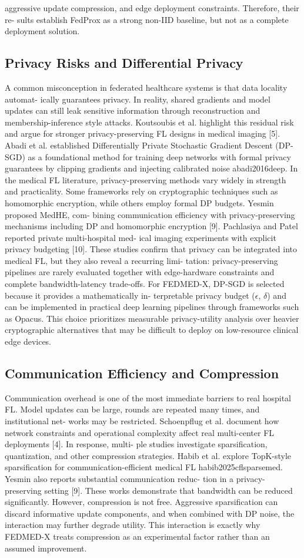 \documentclass[12pt,a4paper]{report}
\begin{document}
aggressive update compression, and edge deployment constraints. Therefore, their re- sults establish FedProx as a strong non-IID baseline, but not as a complete deployment solution.
\subsection{Privacy Risks and Differential Privacy}
A common misconception in federated healthcare systems is that data locality automat- ically guarantees privacy. In reality, shared gradients and model updates can still leak sensitive information through reconstruction and membership-inference style attacks.
Koutsoubis et al. highlight this residual risk and argue for stronger privacy-preserving
FL designs in medical imaging [5].
Abadi et al.
established Differentially Private
Stochastic Gradient Descent (DP-SGD) as a foundational method for training deep networks with formal privacy guarantees by clipping gradients and injecting calibrated noise abadi2016deep.
In the medical FL literature, privacy-preserving methods vary widely in strength and practicality. Some frameworks rely on cryptographic techniques such as homomorphic encryption, while others employ formal DP budgets. Yesmin proposed MedHE, com- bining communication efficiency with privacy-preserving mechanisms including DP and homomorphic encryption [9]. Pachlasiya and Patel reported private multi-hospital med- ical imaging experiments with explicit privacy budgeting [10]. These studies confirm that privacy can be integrated into medical FL, but they also reveal a recurring limi- tation: privacy-preserving pipelines are rarely evaluated together with edge-hardware constraints and complete bandwidth-latency trade-offs.
For FEDMED-X, DP-SGD is selected because it provides a mathematically in- terpretable privacy budget ($\epsilon$, $\delta$) and can be implemented in practical deep learning pipelines through frameworks such as Opacus.
This choice prioritizes measurable privacy-utility analysis over heavier cryptographic alternatives that may be difficult to deploy on low-resource clinical edge devices.

\subsection{Communication Efficiency and Compression}
Communication overhead is one of the most immediate barriers to real hospital FL.
Model updates can be large, rounds are repeated many times, and institutional net- works may be restricted. Schoenpflug et al. document how network constraints and operational complexity affect real multi-center FL deployments [4]. In response, multi- ple studies investigate sparsification, quantization, and other compression strategies.
Habib et al. explore TopK-style sparsification for communication-efficient medical
FL habib2025cflsparsemed. Yesmin also reports substantial communication reduc- tion in a privacy-preserving setting [9]. These works demonstrate that bandwidth can be reduced significantly. However, compression is not free. Aggressive sparsification can discard informative update components, and when combined with DP noise, the interaction may further degrade utility. This interaction is exactly why FEDMED-X treats compression as an experimental factor rather than an assumed improvement.
\end{document}
